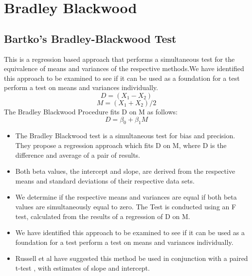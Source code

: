 \documentclass[12pt, a4paper]{report}
\theoremstyle{plain}
\theoremstyle{definition}
\theoremstyle{remark}
\begin{document}
	\chapter{Bradley Blackwood}
	\section{Bartko's Bradley-Blackwood Test}
	This is a regression based
	approach that performs a simultaneous test for the equivalence of
	means and variances of the respective methods.We have identified
	this approach  to be examined to see if it can be used as a
	foundation for a test perform a test on
	means and variances individually.
	\begin{equation}
	D = (X_{1}-X_{2})
	\end{equation}
	\begin{equation}
	M = (X_{1} + X_{2}) /2
	\end{equation}
	The Bradley Blackwood Procedure fits D on M as follows:\\
	\begin{equation}
	D = \beta_{0} + \beta_{1}M
	\end{equation}
	\begin{itemize}
		\item The Bradley Blackwood test is a simultaneous test for bias and
		precision. They propose a regression approach which fits D on M,
		where D is the difference and average of a pair of results.
		\item Both beta values, the intercept and slope, are derived from the respective means and
		standard deviations of their respective data sets.
		\item We determine if the respective means and variances are equal if
		both beta values are simultaneously equal to zero. The Test is
		conducted using an F test, calculated from the results of a
		regression of D on M.
		\item We have identified this approach  to be examined to see if it can
		be used as a foundation for a test perform a test on means and
		variances individually.
		\item Russell et al have suggested this method be used in conjunction
		with a paired t-test , with estimates of slope and intercept.
	\end{itemize}
	
	
\end{document}
